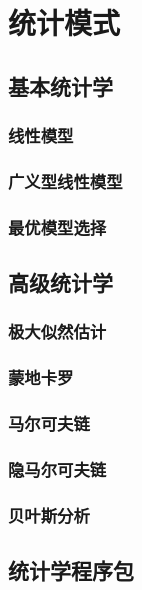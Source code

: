 \documentclass[]{book}
\theoremstyle{definition}
\theoremstyle{definition}
\theoremstyle{definition}
\theoremstyle{remark}
\begin{document}
\chapter{统计模式}\label{stats}

\section{基本统计学}

\subsection{线性模型}

\subsection{广义型线性模型}

\subsection{最优模型选择}

\section{高级统计学}

\subsection{极大似然估计}

\subsection{蒙地卡罗}

\subsection{马尔可夫链}

\subsection{隐马尔可夫链}

\subsection{贝叶斯分析}

\section{统计学程序包}
\end{document}
